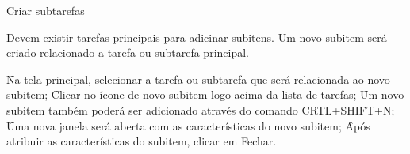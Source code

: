 
\begin{funcionalidade}{Criar subtarefas}



	\condicao
	{Devem existir tarefas principais para adicinar subitens.} %
	{Um novo subitem será criado relacionado a tarefa ou subtarefa principal.} %

	\begin{fluxo}
		\f Na tela principal, selecionar a tarefa ou subtarefa que será relacionada ao novo subitem;
		\f Clicar no ícone de novo subitem logo acima da lista de tarefas;
			\subf
			\f Um novo subitem também poderá ser adicionado através do comando CRTL+SHIFT+N;		
			\voltaf
		\f Uma nova janela será aberta com as características do novo subitem;
		\f Após atribuir as características do subitem, clicar em Fechar.
	\end{fluxo}


\end{funcionalidade}
